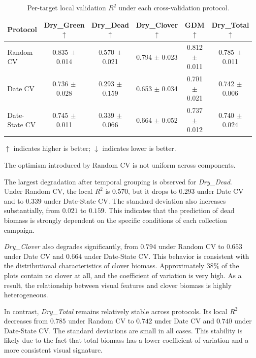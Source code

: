\begin{table}[t]
\centering
\footnotesize
\caption{Per-target local validation $R^2$ under each cross-validation protocol.}
\label{tab:per_target}

\begin{threeparttable}
\begin{tabular}{lccccc}
\hline
Protocol & Dry\_Green $\uparrow$ & Dry\_Dead $\uparrow$ & Dry\_Clover $\uparrow$ & GDM $\uparrow$ & Dry\_Total $\uparrow$ \\
\hline
Random CV     & 0.835 $\pm$ 0.014 & 0.570 $\pm$ 0.021 & 0.794 $\pm$ 0.023 & 0.812 $\pm$ 0.011 & 0.785 $\pm$ 0.011 \\
Date CV       & 0.736 $\pm$ 0.028 & 0.293 $\pm$ 0.159 & 0.653 $\pm$ 0.034 & 0.701 $\pm$ 0.021 & 0.742 $\pm$ 0.006 \\
Date-State CV & 0.745 $\pm$ 0.011 & 0.339 $\pm$ 0.066 & 0.664 $\pm$ 0.052 & 0.737 $\pm$ 0.012 & 0.740 $\pm$ 0.024 \\
\hline
\end{tabular}

\begin{tablenotes}
\footnotesize
\item $\uparrow$ indicates higher is better; $\downarrow$ indicates lower is better.
\end{tablenotes}
\end{threeparttable}
\end{table}

The optimism introduced by Random CV is not uniform across components.

The largest degradation after temporal grouping is observed for \textit{Dry\_Dead}. Under Random CV, the local $R^2$ is $0.570$, but it drops to $0.293$ under Date CV and to $0.339$ under Date-State CV. The standard deviation also increases substantially, from $0.021$ to $0.159$. This indicates that the prediction of dead biomass is strongly dependent on the specific conditions of each collection campaign.

\textit{Dry\_Clover} also degrades significantly, from $0.794$ under Random CV to $0.653$ under Date CV and $0.664$ under Date-State CV. This behavior is consistent with the distributional characteristics of clover biomass. Approximately $38\%$ of the plots contain no clover at all, and the coefficient of variation is very high. As a result, the relationship between visual features and clover biomass is highly heterogeneous.

In contrast, \textit{Dry\_Total} remains relatively stable across protocols. Its local $R^2$ decreases from $0.785$ under Random CV to $0.742$ under Date CV and $0.740$ under Date-State CV. The standard deviations are small in all cases. This stability is likely due to the fact that total biomass has a lower coefficient of variation and a more consistent visual signature.

